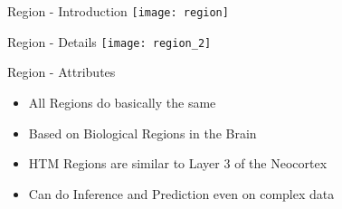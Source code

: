 \begin{frame}[c]{Region - Introduction}
    \pause
    \texttt{[image: region]}
\end{frame}


\begin{frame}[c]{Region - Details}
    \texttt{[image: region\_2]}
\end{frame}


\begin{frame}[c]{Region - Attributes}
    \Large
    \begin{itemize}[<+(1)->]
        \item All Regions do basically the same
        \item Based on Biological Regions in the Brain
        \item HTM Regions are similar to Layer 3 of the Neocortex
        \item Can do Inference and Prediction even on complex data
    \end{itemize}
\end{frame}


